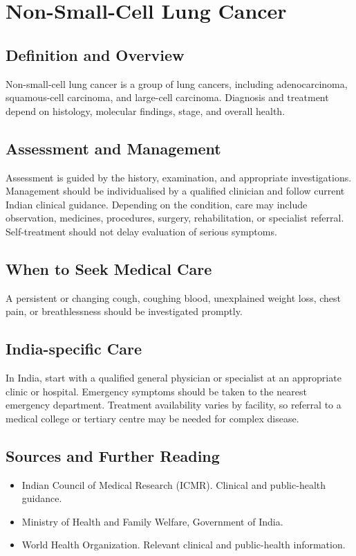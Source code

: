 \chapter{Non-Small-Cell Lung Cancer}

\section*{Definition and Overview}
Non-small-cell lung cancer is a group of lung cancers, including adenocarcinoma, squamous-cell carcinoma, and large-cell carcinoma. Diagnosis and treatment depend on histology, molecular findings, stage, and overall health.

\section*{Assessment and Management}
Assessment is guided by the history, examination, and appropriate investigations. Management should be individualised by a qualified clinician and follow current Indian clinical guidance. Depending on the condition, care may include observation, medicines, procedures, surgery, rehabilitation, or specialist referral. Self-treatment should not delay evaluation of serious symptoms.

\section*{When to Seek Medical Care}
A persistent or changing cough, coughing blood, unexplained weight loss, chest pain, or breathlessness should be investigated promptly.

\section*{India-specific Care}
In India, start with a qualified general physician or specialist at an appropriate clinic or hospital. Emergency symptoms should be taken to the nearest emergency department. Treatment availability varies by facility, so referral to a medical college or tertiary centre may be needed for complex disease.

\section*{Sources and Further Reading}
\begin{itemize}
    \item Indian Council of Medical Research (ICMR). Clinical and public-health guidance.
    \item Ministry of Health and Family Welfare, Government of India.
    \item World Health Organization. Relevant clinical and public-health information.
\end{itemize}

